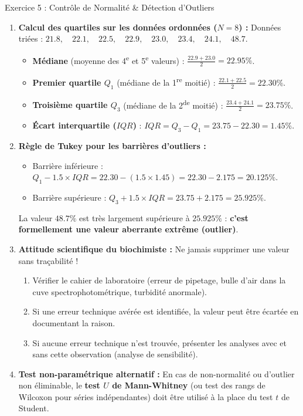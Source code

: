 \documentclass[11pt,a4paper]{article}
\begin{document}
\begin{solutionbox}{Exercice 5 : Contrôle de Normalité \& Détection d'Outliers}
\begin{enumerate}[label=\textbf{\alph*.}]
  \item \textbf{Calcul des quartiles sur les données ordonnées ($N=8$) :}
  Données triées : $21.8, \quad 22.1, \quad 22.5, \quad 22.9, \quad 23.0, \quad 23.4, \quad 24.1, \quad 48.7$.
  \begin{itemize}
    \item \textbf{Médiane} (moyenne des 4\textsuperscript{e} et 5\textsuperscript{e} valeurs) : $\frac{22.9 + 23.0}{2} = \mathbf{22.95\%}$.
    \item \textbf{Premier quartile $Q_1$} (médiane de la 1\textsuperscript{re} moitié) : $\frac{22.1 + 22.5}{2} = \mathbf{22.30\%}$.
    \item \textbf{Troisième quartile $Q_3$} (médiane de la 2\textsuperscript{de} moitié) : $\frac{23.4 + 24.1}{2} = \mathbf{23.75\%}$.
    \item \textbf{Écart interquartile ($IQR$)} : $IQR = Q_3 - Q_1 = 23.75 - 22.30 = \mathbf{1.45\%}$.
  \end{itemize}

  \item \textbf{Règle de Tukey pour les barrières d'outliers :}
  \begin{itemize}
    \item Barrière inférieure : $Q_1 - 1.5 \times IQR = 22.30 - (1.5 \times 1.45) = 22.30 - 2.175 = \mathbf{20.125\%}$.
    \item Barrière supérieure : $Q_3 + 1.5 \times IQR = 23.75 + 2.175 = \mathbf{25.925\%}$.
  \end{itemize}
  La valeur $48.7\%$ est très largement supérieure à $25.925\%$ : \textbf{c'est formellement une valeur aberrante extrême (outlier)}.

  \item \textbf{Attitude scientifique du biochimiste :}
  Ne jamais supprimer une valeur sans traçabilité !
  \begin{enumerate}
    \item Vérifier le cahier de laboratoire (erreur de pipetage, bulle d'air dans la cuve spectrophotométrique, turbidité anormale).
    \item Si une erreur technique avérée est identifiée, la valeur peut être écartée en documentant la raison.
    \item Si aucune erreur technique n'est trouvée, présenter les analyses avec et sans cette observation (analyse de sensibilité).
  \end{enumerate}

  \item \textbf{Test non-paramétrique alternatif :}
  En cas de non-normalité ou d'outlier non éliminable, le \textbf{test $U$ de Mann-Whitney} (ou test des rangs de Wilcoxon pour séries indépendantes) doit être utilisé à la place du test $t$ de Student.
\end{enumerate}
\end{solutionbox}
\end{document}
